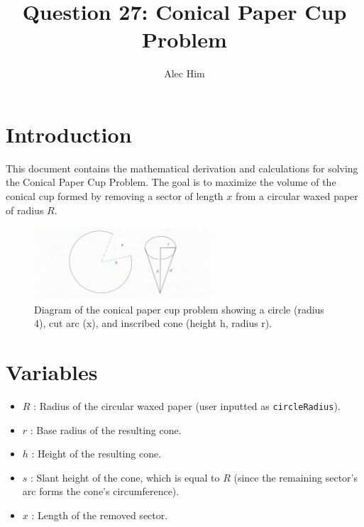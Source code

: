 \documentclass{article}
\title{Question 27: Conical Paper Cup Problem}
\author{Alec Him}
\date{}
\begin{document}
\maketitle


\section{Introduction}
This document contains the mathematical derivation and calculations for solving the Conical Paper Cup Problem. The goal is to maximize the volume of the conical cup formed by removing a sector of length \( x \) from a circular waxed paper of radius \( R \).
\begin{figure}[h!]
    \centering
    \includegraphics[width=0.6\textwidth]{Figure1.pdf}
    \caption{Diagram of the conical paper cup problem showing a circle (radius 4), cut arc (x), and inscribed cone (height h, radius r).}
    \label{fig.Graph}
\end{figure}


\section{Variables}
\begin{itemize}
    \item \( R \) : Radius of the circular waxed paper (user inputted as \texttt{circleRadius}).
    \item \( r \) : Base radius of the resulting cone.
    \item \( h \) : Height of the resulting cone.
    \item \( s \) : Slant height of the cone, which is equal to \( R \) (since the remaining sector's arc forms the cone's circumference).
    \item \( x \) : Length of the removed sector.
\end{itemize}
\end{document}

